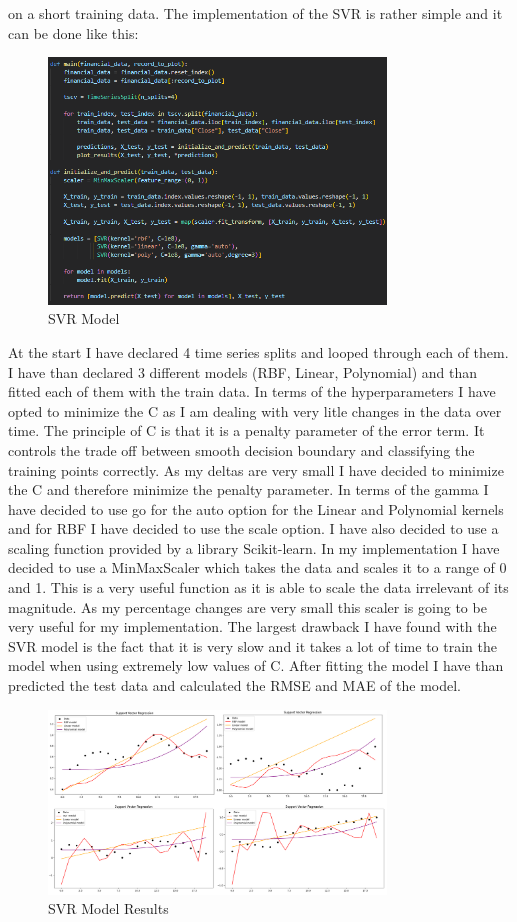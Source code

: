 \documentclass{imc-inf}
\begin{document}
			on a short training data. The implementation of the SVR is rather simple and it can be done like this:
			\begin{figure}[h]
				\centering
				\includegraphics[width=0.8\textwidth]{svr_code.png}
				\caption{SVR Model}
				\label{fig:svr_model}
			\end{figure}
			At the start I have declared 4 time series splits and looped through each of them. I have than declared 3 different models (RBF, Linear, Polynomial) and than fitted each of them with the train data.
			In terms of the hyperparameters I have opted to minimize the C as I am dealing with very litle changes in the data over time. The principle of C is that it is a penalty parameter of the error term.
			It controls the trade off between smooth decision boundary and classifying the training points correctly. As my deltas are very small I have decided to minimize the C and therefore minimize the penalty parameter. 
			In terms of the gamma I have decided to use go for the auto option for the Linear and Polynomial kernels and for RBF I have decided to use the scale option. I have also decided to use a scaling function
			provided by a library Scikit-learn. In my implementation I have decided to use a MinMaxScaler which takes the data and scales it to a range of 0 and 1. This is a very useful function as it is able to scale the data 
			irrelevant of its magnitude. As my percentage changes are very small this scaler is going to be very useful for my implementation.
			The largest drawback I have found with the SVR model is the fact that it is very slow and it takes a lot of time to train the model when using extremely low values of C. 
			After fitting the model I have than predicted the test data and calculated the RMSE and MAE of the model.
			\begin{figure}[h]
				\centering
				\includegraphics[width=0.8\textwidth]{svr_chart.png}
				\caption{SVR Model Results}
				\label{fig:svr_model_plots}
			\end{figure}
\end{document}

